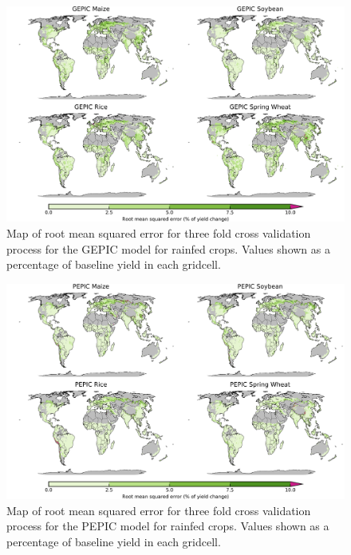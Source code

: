 \documentclass[10pt]{article}
\begin{document}
\begin{figure}[h!]
\centering
\includegraphics[width=15.5cm]{GEPIC_spatial_MSE_ton_ha.png}
\caption{Map of root mean squared error for three fold cross validation process for the GEPIC model for rainfed crops. Values shown as a percentage of baseline yield in each gridcell.}
\label{fig:pdssatrmse}
\end{figure}

\begin{figure}[h!]
\centering
\includegraphics[width=15.5cm]{PEPIC_spatial_MSE_ton_ha.png}
\caption{Map of root mean squared error for three fold cross validation process for the PEPIC model for rainfed crops. Values shown as a percentage of baseline yield in each gridcell.}
\label{fig:pdssatrmse}
\end{figure}

\clearpage
\end{document}
